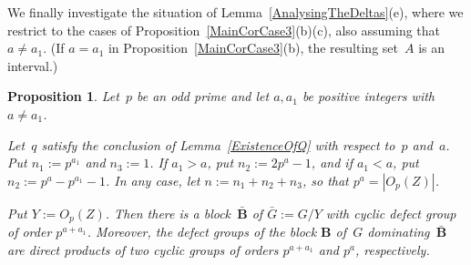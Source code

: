 \documentclass[12pt]{amsart}
\newcommand{\bB}{{\mathbf{B}}}
\newtheorem{prop}[thm]{Proposition}
\theoremstyle{theorem}
\theoremstyle{definition}
\theoremstyle{remark}
\begin{document}
We finally investigate the situation of Lemma~\ref{AnalysingTheDeltas}(e),
where we restrict to the cases of Proposition~\ref{MainCorCase3}(b)(c), also
assuming that $a \neq a_1$. (If $a = a_1$ in Proposition~\ref{MainCorCase3}(b),
the resulting set~$A$ is an interval.)

\begin{prop}
\label{Existence3Prop}
Let~$p$ be an odd prime and let $a, a_1$ be positive integers with $a \neq a_1$.

Let~$q$ satisfy the conclusion of {\rm Lemma~\ref{ExistenceOfQ}} with respect
to~$p$ and~$a$. Put $n_1 := p^{a_1}$ and $n_3 := 1$. If $a_1 > a$, put 
$n_2 := 2p^a - 1$, and if $a_1 < a$, put $n_2 := p^a - p^{a_1} - 1$. In any 
case, let $n := n_1 + n_2 + n_3$, so that $p^a = |O_p( Z )|$. 

Put $Y := O_p( Z )$.  Then there is a block~$\bar{\bB}$ of 
$\bar{G} := G/Y$ with cyclic defect group of order $p^{a+a_1}$. Moreover, the 
defect groups of the block $\bB$ of~$G$ dominating~$\bar{\bB}$ are direct 
products of two cyclic groups of orders $p^{a+a_1}$ and $p^{a}$, respectively.
\end{prop}
\end{document}
